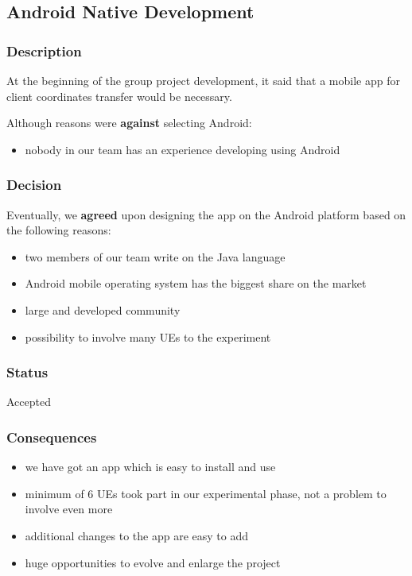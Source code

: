 \subsection{Android Native Development}\label{android-native-development}

\subsubsection{Description}\label{description}

At the beginning of the group project development, it said that a mobile
app for client coordinates transfer would be necessary.

Although reasons were \textbf{against} selecting Android:

\begin{itemize}
\tightlist
\item
  nobody in our team has an experience developing using Android
\end{itemize}

\subsubsection{Decision}\label{decision}

Eventually, we \textbf{agreed} upon designing the app on the Android
platform based on the following reasons:

\begin{itemize}
\tightlist
\item
  two members of our team write on the Java language
\item
  Android mobile operating system has the biggest share on the market
\item
  large and developed community
\item
  possibility to involve many UEs to the experiment
\end{itemize}

\subsubsection{Status}\label{status}

Accepted

\subsubsection{Consequences}\label{consequences}

\begin{itemize}
\tightlist
\item
  we have got an app which is easy to install and use
\item
  minimum of 6 UEs took part in our experimental phase, not a problem to
  involve even more
\item
  additional changes to the app are easy to add
\item
  huge opportunities to evolve and enlarge the project
\end{itemize}

